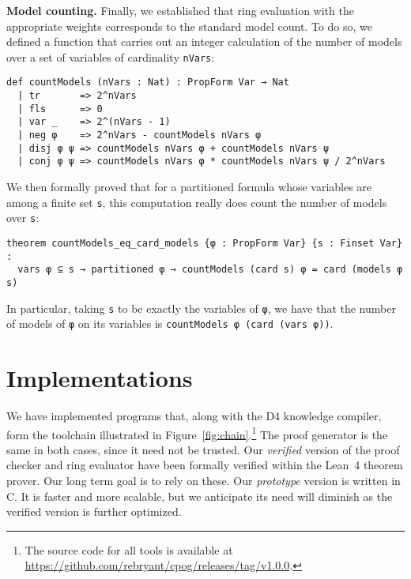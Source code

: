\documentclass[letterpaper,USenglish,cleveref, autoref, thm-restate]{lipics-v2021}
\newcommand{\progname}[1]{\textsc{#1}}
\newcommand{\dfour}{\progname{D4}}
\newcommand{\lean}{Lean~4}
\begin{document}
\vspace{1em}\noindent
\textbf{Model counting.} Finally, we established that ring evaluation with the appropriate weights
corresponds to the standard model count. To do so, we defined a function that
carries out an integer calculation of the number of models over a set of variables
of cardinality \lstinline{nVars}:
\begin{lstlisting}
def countModels (nVars : Nat) : PropForm Var → Nat
  | tr       => 2^nVars
  | fls      => 0
  | var _    => 2^(nVars - 1)
  | neg φ    => 2^nVars - countModels nVars φ
  | disj φ ψ => countModels nVars φ + countModels nVars ψ
  | conj φ ψ => countModels nVars φ * countModels nVars ψ / 2^nVars
\end{lstlisting}
We then formally proved that for a partitioned formula whose variables are among a finite set
\lstinline{s}, this computation really does count the number of models over \lstinline{s}:
\begin{lstlisting}
theorem countModels_eq_card_models {φ : PropForm Var} {s : Finset Var} :
  vars φ ⊆ s → partitioned φ → countModels (card s) φ = card (models φ s)
\end{lstlisting}
In particular, taking \lstinline{s} to be exactly the variables of \lstinline{φ},
we have that the number of models of \lstinline{φ} on its variables is
\lstinline{countModels φ (card (vars φ))}.


\section{Implementations}
We have implemented programs that, along with
the \dfour{} knowledge compiler, form the toolchain illustrated in
Figure~\ref{fig:chain}.\footnote{The source code for all tools
is available at \url{https://github.com/rebryant/cpog/releases/tag/v1.0.0}.}  The proof generator is the same in both
cases, since it need not be trusted.
Our \emph{verified}
version of the proof checker and ring evaluator have been formally
verified within the \lean{} theorem prover.  Our long term goal is to
rely on these.  Our \emph{prototype} version is written in C\@.
It is faster and
more scalable, but we anticipate its need will diminish as the
verified version is further optimized.
\end{document}
